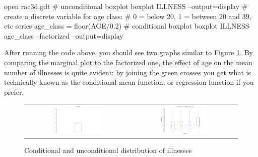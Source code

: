 \begin{scode}
open rac3d.gdt
# unconditional boxplot
boxplot ILLNESS --output=display
# create a discrete variable for age class: 
# 0 = below 20, 1 = between 20 and 39, etc
series age_class = floor(AGE/0.2)
# conditional boxplot
boxplot ILLNESS age_class --factorized --output=display
\end{scode}

After running the code above, you should see two graphs similar to
Figure \ref{fig:fact-boxplots}. By comparing the marginal plot to
the factorized one, the effect of age on the mean number of illnesses
is quite evident: by joining the green crosses you get what is
technically known as the conditional mean function, or regression
function if you prefer.

\begin{figure}[htbp]
  \centering
  \begin{tabular}{cc}
    \includegraphics[width=0.475\textwidth]{figures/uboxplot} & 
    \includegraphics[width=0.475\textwidth]{figures/fboxplot}
  \end{tabular}
  \caption{Conditional and unconditional distribution of illnesses}
  \label{fig:fact-boxplots}
\end{figure}


